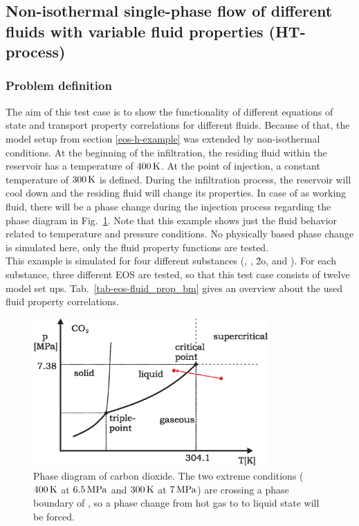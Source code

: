 \subsection[Non-isothermal single-phase flow]{Non-isothermal single-phase flow of different fluids with variable fluid properties (HT-process)}
\label{eos-ht-example}

\subsubsection*{Problem definition}

The aim of this test case is to show the functionality of different equations of state and transport property correlations for different fluids. Because of that, the model setup from section \ref{eos-h-example} was extended by non-isothermal conditions. At the beginning of the infiltration, the residing fluid within the reservoir has a temperature of $\unit[400]{K}$. At the point of injection, a constant temperature of $\unit[300]{K}$ is defined. During the infiltration process, the reservoir will cool down and the residing fluid will change its properties. In case of  as working fluid, there will be a phase change during the injection process regarding the  phase diagram in Fig.~\ref{fig-eos-phase}. Note that this example shows just the fluid behavior related to temperature and pressure conditions. No physically based phase change is simulated here, only the fluid property functions are tested.\\[1.5ex] 

This example is simulated for four different substances (, , \h2o, and ). For each substance, three different EOS are tested, so that this test case consists of twelve model set ups. Tab.~\ref{tab-eos-fluid_prop_bm} gives an overview about the used fluid property correlations.

\begin{figure}[h]
\centering
\includegraphics[width=0.8\textwidth]{FLUID_PROPERTIES/figures/phase-diagram-co2.eps}
\caption{Phase diagram of carbon dioxide. The two extreme conditions ($\unit[400]{K}$ at $\unit[6.5]{MPa}$ and $\unit[300]{K}$ at $\unit[7]{MPa}$) are crossing a phase boundary of , so a phase change from hot gas to  to liquid state will be forced.}
\label{fig-eos-phase}
\end{figure}

